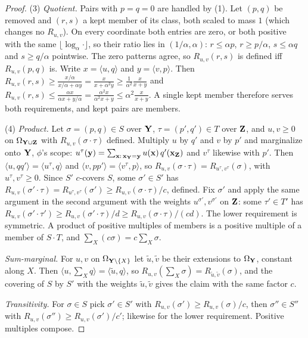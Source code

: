 \documentclass{article} %
\begin{document}
\begin{proof}
(3) \emph{Quotient.} Pairs with $p=q=0$ are handled by (1). Let $(p,q)$ be removed and
$(r,s)$ a kept member of its class, both scaled to mass $1$ (which changes no $R_{u,v}$). On
every coordinate both entries are zero, or both positive with the same
$\lfloor\log_\alpha\cdot\rfloor$, so their ratio lies in $(1/\alpha,\alpha)$:
$r\le\alpha p$, $r\ge p/\alpha$, $s\le\alpha q$ and $s\ge q/\alpha$ pointwise. The zero
patterns agree, so $R_{u,v}(r,s)$ is defined iff $R_{u,v}(p,q)$ is. Write
$x=\langle u,q\rangle$ and $y=\langle v,p\rangle$. Then
$R_{u,v}(r,s)\ge \frac{x/\alpha}{x/\alpha+\alpha y}=\frac{x}{x+\alpha^2y}\ge
\frac{1}{\alpha^2}\frac{x}{x+y}$ and $R_{u,v}(r,s)\le\frac{\alpha x}{\alpha x+y/\alpha}
=\frac{\alpha^2x}{\alpha^2x+y}\le\alpha^2\frac{x}{x+y}$. A single kept member therefore
serves both requirements, and kept pairs are members.

(4) \emph{Product.} Let $\sigma=(p,q)\in S$ over $\mathbf{Y}$, $\tau=(p',q')\in T$ over $\mathbf{Z}$, and
$u,v\ge0$ on $\Omega_{\mathbf{Y}\cup\mathbf{Z}}$ with $R_{u,v}(\sigma\cdot\tau)$ defined. Multiply $u$ by
$q'$ and $v$ by $p'$ and marginalize onto $\mathbf{Y}$, $\phi$'s scope:
$u^\tau(\mathbf y)=\sum_{\mathbf x:\,\mathbf x_{\mathbf{Y}}=\mathbf y}u(\mathbf x)\,q'(\mathbf x_{\mathbf{Z}})$ and
$v^\tau$ likewise with $p'$. Then $\langle u,qq'\rangle=\langle u^\tau,q\rangle$ and
$\langle v,pp'\rangle=\langle v^\tau,p\rangle$, so
$R_{u,v}(\sigma\cdot\tau)=R_{u^\tau,v^\tau}(\sigma)$, with $u^\tau,v^\tau\ge0$. Since $S'$
$c$-covers $S$, some $\sigma'\in S'$ has $R_{u,v}(\sigma'\cdot\tau)=R_{u^\tau,v^\tau}(\sigma')
\ge R_{u,v}(\sigma\cdot\tau)/c$, defined. Fix $\sigma'$ and apply the same argument in the
second argument with the weights $u^{\sigma'},v^{\sigma'}$ on $\mathbf{Z}$: some $\tau'\in T'$ has
$R_{u,v}(\sigma'\cdot\tau')\ge R_{u,v}(\sigma'\cdot\tau)/d\ge R_{u,v}(\sigma\cdot\tau)/(cd)$.
The lower requirement is symmetric. A product of positive multiples of members is a positive
multiple of a member of $S\cdot T$, and $\sum_X(c\sigma)=c\sum_X\sigma$.

\emph{Sum-marginal.} For $u,v$ on $\Omega_{\mathbf{Y}\setminus\{X\}}$ let $\tilde u,\tilde v$ be
their extensions to $\Omega_{\mathbf{Y}}$, constant along $X$. Then $\langle u,\sum_Xq\rangle=
\langle\tilde u,q\rangle$, so $R_{u,v}(\sum_X\sigma)=R_{\tilde u,\tilde v}(\sigma)$, and the
covering of $S$ by $S'$ with the weights $\tilde u,\tilde v$ gives the claim with the same
factor $c$.

\emph{Transitivity.} For $\sigma\in S$ pick $\sigma'\in S'$ with $R_{u,v}(\sigma')\ge
R_{u,v}(\sigma)/c$, then $\sigma''\in S''$ with $R_{u,v}(\sigma'')\ge
R_{u,v}(\sigma')/c'$; likewise for the lower requirement. Positive multiples compose.
\end{proof}
\end{document}
